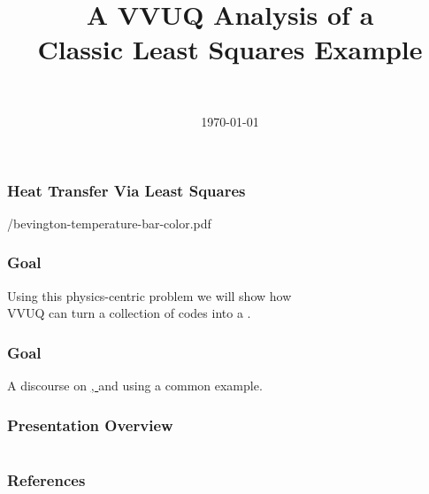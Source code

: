 \documentclass{beamer}
\title[VVUQ and the Bevington Example]{A VVUQ Analysis of a \\ Classic Least Squares Example}
\author[\TopaHII]{\TopaDSG \\ \TopaDSGemail}
\institute{\dsgit}
\date{\today}
\begin{document}
\begin{frame}
    \titlepage
\end{frame}

\begin{frame}\frametitle{Heat Transfer Via Least Squares}
\begin{center}
	\begin{overpic}[ width = \textwidth ]
		{\pGraphics/bevington-temperature-bar-color.pdf}
	\end{overpic}
\end{center}
\end{frame}
%
			
%
\begin{frame}\frametitle{Goal}
\center
	Using this physics-centric problem we will show how \\
	VVUQ can turn a collection of codes into a 
	.
\end{frame}
%
\begin{frame}\frametitle{Goal}
\center
	A discourse on \href{https://en.wikipedia.org/wiki/Software_verification_and_validation}{, } and \bl{\uq} using a common example.
\twodots
\end{frame}
%

\begin{frame}[ allowframebreaks ]\frametitle{Presentation Overview}
    \tableofcontents
\end{frame}

	
	
	
	

\appendix
	
	
\section{} %
\begin{frame}[ allowframebreaks ]
    \frametitle{References}
    \printbibliography
\end{frame}

\begin{frame}
    \titlepage
\end{frame}
\end{document}
